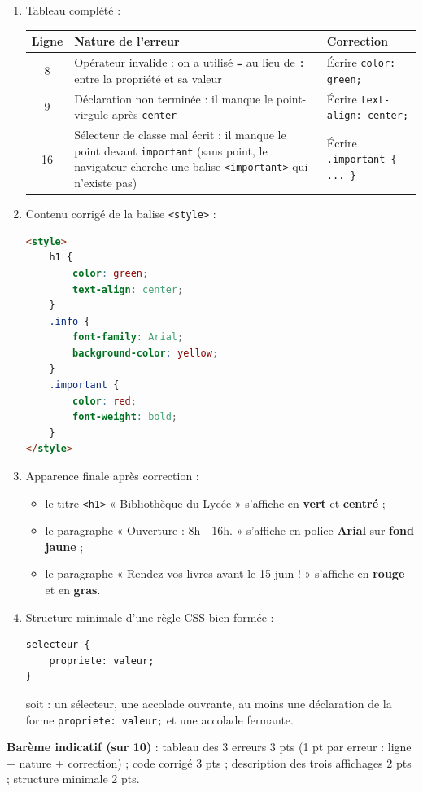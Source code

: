 \documentclass[11pt]{article}
\newcommand{\cle}[1]{{\popxbold\color{popdark}#1}}
\begin{document}
\begin{corrige}
\begin{enumerate}
  \item Tableau complété :
\begin{center}
\begin{tabularx}{\linewidth}{|c|X|X|}
\hline
\rowcolor{popblueL} \textbf{Ligne} & \textbf{Nature de l'erreur} & \textbf{Correction} \\
\hline
8 & Opérateur invalide : on a utilisé \texttt{=} au lieu de \texttt{:} entre la propriété et sa valeur & Écrire \texttt{color: green;} \\
\hline
9 & Déclaration non terminée : il manque le point-virgule après \texttt{center} & Écrire \texttt{text-align: center;} \\
\hline
16 & Sélecteur de classe mal écrit : il manque le point devant \texttt{important} (sans point, le navigateur cherche une balise \texttt{<important>} qui n'existe pas) & Écrire \texttt{.important \{ ... \}} \\
\hline
\end{tabularx}
\end{center}
  \item Contenu corrigé de la balise \texttt{<style>} :
\begin{lstlisting}[language=HTML]
<style>
    h1 {
        color: green;
        text-align: center;
    }
    .info {
        font-family: Arial;
        background-color: yellow;
    }
    .important {
        color: red;
        font-weight: bold;
    }
</style>
\end{lstlisting}
  \item Apparence finale après correction :
  \begin{itemize}
    \item le titre \texttt{<h1>} « Bibliothèque du Lycée » s'affiche en \textbf{vert} et \textbf{centré} ;
    \item le paragraphe « Ouverture : 8h - 16h. » s'affiche en police \textbf{Arial} sur \textbf{fond jaune} ;
    \item le paragraphe « Rendez vos livres avant le 15 juin ! » s'affiche en \textbf{rouge} et en \textbf{gras}.
  \end{itemize}
  \item Structure minimale d'une règle \cle{CSS} bien formée :
\begin{lstlisting}
selecteur {
    propriete: valeur;
}
\end{lstlisting}
soit : un \cle{sélecteur}, une accolade ouvrante, au moins une déclaration de la forme \texttt{propriete: valeur;} et une accolade fermante.
\end{enumerate}
\textbf{Barème indicatif (sur 10)} : tableau des 3 erreurs 3 pts (1 pt par erreur : ligne + nature + correction) ; code corrigé 3 pts ; description des trois affichages 2 pts ; structure minimale 2 pts.


\end{corrige}
\end{document}
